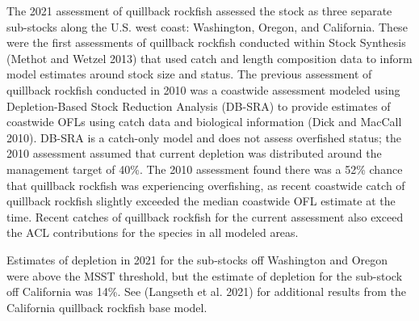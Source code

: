 \documentclass[11pt,
  english,
  a4paper,
]{article}
\begin{document}
The 2021 assessment of quillback rockfish assessed the stock as three separate sub-stocks along the U.S. west coast: Washington, Oregon, and California. These were the first assessments of quillback rockfish conducted within Stock Synthesis {(Methot and Wetzel 2013)\leavevmode\tagmcend\tagstructend} that used catch and length composition data to inform model estimates around stock size and status. The previous assessment of quillback rockfish conducted in 2010 was a coastwide assessment modeled using Depletion-Based Stock Reduction Analysis (DB-SRA) to provide estimates of coastwide OFLs using catch data and biological information {(Dick and MacCall 2010)\leavevmode\tagmcend\tagstructend}. DB-SRA is a catch-only model and does not assess overfished status; the 2010 assessment assumed that current depletion was distributed around the management target of 40\%. The 2010 assessment found there was a 52\% chance that quillback rockfish was experiencing overfishing, as recent coastwide catch of quillback rockfish slightly exceeded the median coastwide OFL estimate at the time. Recent catches of quillback rockfish for the current assessment also exceed the ACL contributions for the species in all modeled areas.

\leavevmode\tagmcend\tagstructend\par


Estimates of depletion in 2021 for the sub-stocks off Washington and Oregon were above the MSST threshold, but the estimate of depletion for the sub-stock off California was 14\%. See {(Langseth et al. 2021)\leavevmode\tagmcend\tagstructend} for additional results from the California quillback rockfish base model.

\leavevmode\tagmcend\tagstructend\par

\end{document}
